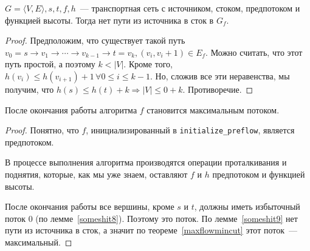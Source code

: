 \begin{lemma}\label{someshit9}
	$G=\langle V,E\rangle,s,t,f,h$~--- транспортная сеть с источником, стоком, предпотоком и функцией высоты. Тогда нет пути из источника в сток в $G_f$.
\end{lemma}
\begin{proof}
	Предположим, что существует такой путь $v_0=s\to v_1\to\cdots\to v_{k-1}\to t=v_k, (v_i,v_i+1)\in E_f$.
	Можно считать, что этот путь простой, а поэтому $k<|V|$.
	Кроме того, $h(v_i)\le h(v_{i+1})+1\,\forall 0\le i\le k-1$. Но, сложив все эти неравенства, мы получим, что $h(s)\le h(t)+k\Rightarrow |V|\le 0+k$. Противоречие.
\end{proof}
\begin{theorem}[О корректности]
	После окончания работы алгоритма $f$ становится максимальным потоком.
\end{theorem}
\begin{proof}
	Понятно, что $f$, инициализированный в \texttt{initialize\_preflow}, является предпотоком.

	В процессе выполнения алгоритма производятся операции проталкивания и поднятия, которые, как мы уже знаем, оставляют $f$ и $h$ предпотоком и функцией высоты.

	После окончания работы все вершины, кроме $s$ и $t$, должны иметь избыточный поток 0 (по лемме~\ref{someshit8}). Поэтому это поток. По лемме~\ref{someshit9} нет пути из источника в сток, а значит по теореме~\ref{maxflowmincut} этот поток~--- максимальный.
\end{proof}

